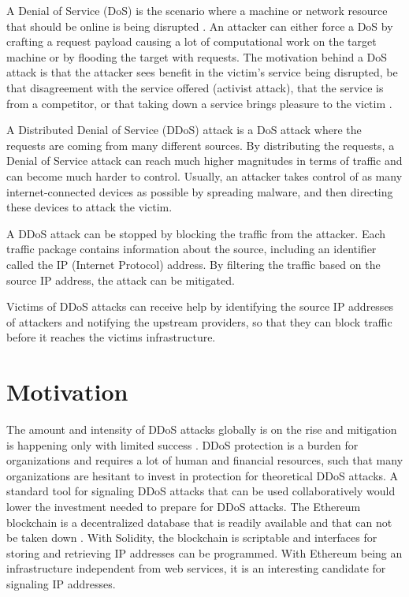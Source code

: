 A Denial of Service (DoS) is the scenario where a machine or network resource that should be online is being disrupted \cite{USCERT}. An attacker can either force a DoS by crafting a request payload causing a lot of computational work on the target machine or by flooding the target with requests. The motivation behind a DoS attack is that the attacker sees benefit in the victim's service being disrupted, be that disagreement with the service offered (activist attack), that the service is from a competitor, or that taking down a service brings pleasure to the victim \cite{DDoSOverview}.

A Distributed Denial of Service (DDoS) attack is a DoS attack where the requests are coming from many different sources. By distributing the requests, a Denial of Service attack can reach much higher magnitudes in terms of traffic and can become much harder to control.
Usually, an attacker takes control of as many internet-connected devices as possible by spreading malware, and then directing these devices to attack the victim.

A DDoS attack can be stopped by blocking the traffic from the attacker. Each traffic package contains information about the source, including an identifier called the IP (Internet Protocol) address. By filtering the traffic based on the source IP address, the attack can be mitigated.

Victims of DDoS attacks can receive help by identifying the source IP addresses of attackers and notifying the upstream providers, so that they can block traffic before it reaches the victims infrastructure.

\section{Motivation}

The amount and intensity of DDoS attacks globally is on the rise and mitigation is happening only with limited success \cite{DDoSRise}. 
DDoS protection is a burden for organizations and requires a lot of human and financial resources, such that many organizations are hesitant to invest in protection for theoretical DDoS attacks. A standard tool for signaling DDoS attacks that can be used collaboratively would lower the investment needed to prepare for DDoS attacks.
The Ethereum blockchain is a decentralized database that is readily available and that can not be taken down \cite{Ethereum}. With Solidity, the blockchain is scriptable and interfaces for storing and retrieving IP addresses can be programmed. With Ethereum being an infrastructure independent from web services, it is an interesting candidate for signaling IP addresses.

